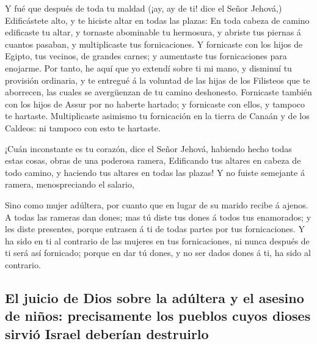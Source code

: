  Y fué que después de toda tu maldad (¡ay, ay de ti! dice
el Señor Jehová,)  Edificástete alto, y te hiciste altar
en todas las plazas:  En toda cabeza de camino edificaste
tu altar, y tornaste abominable tu hermosura, y abriste tus piernas á
cuantos pasaban, y multiplicaste tus fornicaciones.  Y
fornicaste con los hijos de Egipto, tus vecinos, de grandes carnes; y
aumentaste tus fornicaciones para enojarme.  Por tanto,
he aquí que yo extendí sobre ti mi mano, y disminuí tu provisión
ordinaria, y te entregué á la voluntad de las hijas de los Filisteos que
te aborrecen, las cuales se avergüenzan de tu camino deshonesto.
 Fornicaste también con los hijos de Assur por no haberte
hartado; y fornicaste con ellos, y tampoco te hartaste. 
Multiplicaste asimismo tu fornicación en la tierra de Canaán y de los
Caldeos: ni tampoco con esto te hartaste.

 ¡Cuán inconstante es tu corazón, dice el Señor Jehová,
habiendo hecho todas estas cosas, obras de una poderosa ramera,
 Edificando tus altares en cabeza de todo camino, y
haciendo tus altares en todas las plazas! Y no fuiste semejante á
ramera, menospreciando el salario,

 Sino como mujer adúltera, por cuanto que en lugar de su
marido recibe á ajenos.  A todas las rameras dan dones;
mas tú diste tus dones á todos tus enamorados; y les diste presentes,
porque entrasen á ti de todas partes por tus fornicaciones.
 Y ha sido en ti al contrario de las mujeres en tus
fornicaciones, ni nunca después de ti será así fornicado; porque en dar
tú dones, y no ser dados dones á ti, ha sido al contrario.

\hypertarget{el-juicio-de-dios-sobre-la-aduxfaltera-y-el-asesino-de-niuxf1os-precisamente-los-pueblos-cuyos-dioses-sirviuxf3-israel-deberuxedan-destruirlo}{%
\subsection{El juicio de Dios sobre la adúltera y el asesino de niños:
precisamente los pueblos cuyos dioses sirvió Israel deberían
destruirlo}\label{el-juicio-de-dios-sobre-la-aduxfaltera-y-el-asesino-de-niuxf1os-precisamente-los-pueblos-cuyos-dioses-sirviuxf3-israel-deberuxedan-destruirlo}}

